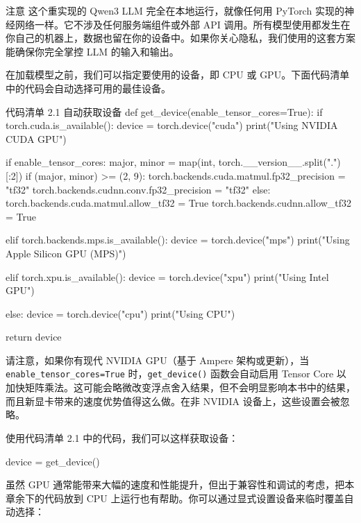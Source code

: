 \begin{myWarning}{注意}
 这个重实现的 Qwen3 LLM 完全在本地运行，就像任何用 PyTorch 实现的神经网络一样。它不涉及任何服务端组件或外部 API 调用。所有模型使用都发生在你自己的机器上，数据也留在你的设备中。如果你关心隐私，我们使用的这套方案能确保你完全掌控 LLM 的输入和输出。\end{myWarning}

在加载模型之前，我们可以指定要使用的设备，即 CPU 或 GPU。下面代码清单中的代码会自动选择可用的最佳设备。

\begin{codeboxt}{代码清单 2.1 自动获取设备}
def get_device(enable_tensor_cores=True):
    if torch.cuda.is_available():
        device = torch.device("cuda")
        print("Using NVIDIA CUDA GPU")

        if enable_tensor_cores:
            major, minor = map(int, torch.__version__.split(".")[:2])
            if (major, minor) >= (2, 9):
                torch.backends.cuda.matmul.fp32_precision = "tf32"
                torch.backends.cudnn.conv.fp32_precision = "tf32"
            else:
                torch.backends.cuda.matmul.allow_tf32 = True
                torch.backends.cudnn.allow_tf32 = True

    elif torch.backends.mps.is_available():
        device = torch.device("mps")
        print("Using Apple Silicon GPU (MPS)")

    elif torch.xpu.is_available():
        device = torch.device("xpu")
        print("Using Intel GPU")

    else:
        device = torch.device("cpu")
        print("Using CPU")

    return device
\end{codeboxt}

请注意，如果你有现代 NVIDIA GPU（基于 Ampere 架构或更新），当 \texttt{enable\_tensor\_cores=True} 时，\texttt{get\_device()} 函数会自动启用 Tensor Core 以加快矩阵乘法。这可能会略微改变浮点舍入结果，但不会明显影响本书中的结果，而且新显卡带来的速度优势值得这么做。在非 NVIDIA 设备上，这些设置会被忽略。

使用代码清单 2.1 中的代码，我们可以这样获取设备：

\begin{codebox}
device = get_device()
\end{codebox}

虽然 GPU 通常能带来大幅的速度和性能提升，但出于兼容性和调试的考虑，把本章余下的代码放到 CPU 上运行也有帮助。你可以通过显式设置设备来临时覆盖自动选择：

